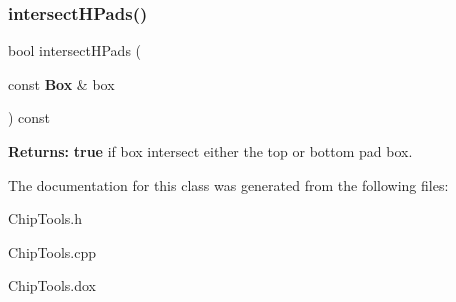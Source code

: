 \subsubsection{\texorpdfstring{intersect\+H\+Pads()}{intersectHPads()}}
{\footnotesize\ttfamily bool intersect\+H\+Pads (\begin{DoxyParamCaption}\item[{const \textbf{ Box} \&}]{box }\end{DoxyParamCaption}) const\hspace{0.3cm}{\ttfamily [inline]}}

{\bfseries Returns\+:} {\bfseries true} if {\ttfamily box} intersect either the top or bottom pad box. 

The documentation for this class was generated from the following files\+:\begin{DoxyCompactItemize}
\item 
Chip\+Tools.\+h\item 
Chip\+Tools.\+cpp\item 
Chip\+Tools.\+dox\end{DoxyCompactItemize}
